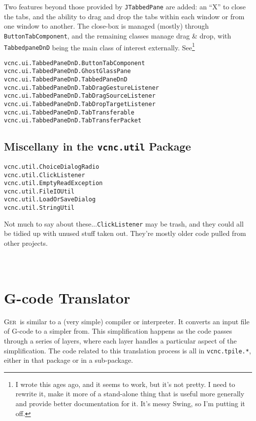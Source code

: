\documentclass[titlepage,oneside,10pt]{article}
\newcommand{\ger}{\textsc{Ger}}
\begin{document}
Two features beyond those provided by {\tt JTabbedPane}
are added: an ``X'' to close the tabs, and the ability to drag and
drop the tabs within each window or from one window to another. The
close-box is managed (mostly) through {\tt ButtonTabComponent}, and
the remaining classes manage drag \& drop, with {\tt TabbedpaneDnD}
being the main class of interest externally. See\footnote{I wrote this
ages ago, and it seems to work, but it's not pretty. I need to rewrite
it, make it more of a stand-alone thing that is useful more generally
and provide better documentation for it. It's messy Swing, so I'm
putting it off. }
\begin{verbatim}
vcnc.ui.TabbedPaneDnD.ButtonTabComponent
vcnc.ui.TabbedPaneDnD.GhostGlassPane
vcnc.ui.TabbedPaneDnD.TabbedPaneDnD
vcnc.ui.TabbedPaneDnD.TabDragGestureListener
vcnc.ui.TabbedPaneDnD.TabDragSourceListener
vcnc.ui.TabbedPaneDnD.TabDropTargetListener
vcnc.ui.TabbedPaneDnD.TabTransferable
vcnc.ui.TabbedPaneDnD.TabTransferPacket
\end{verbatim}

\subsection{Miscellany in the {\tt vcnc.util} Package}

\begin{verbatim}
vcnc.util.ChoiceDialogRadio
vcnc.util.ClickListener
vcnc.util.EmptyReadException
vcnc.util.FileIOUtil
vcnc.util.LoadOrSaveDialog
vcnc.util.StringUtil
\end{verbatim}

Not much to say about these...{\tt ClickListener} may be trash, and
they could all be tidied up with unused stuff taken out. They're
mostly older code pulled from other projects.

\begin{verbatim}
\end{verbatim}
\begin{verbatim}
\end{verbatim}
\begin{verbatim}
\end{verbatim}

\section{G-code Translator}

\ger\ is similar to a (very simple) compiler or interpreter. It
converts an input file of G-code to a simpler from. This
simplification happens as the code passes through a series of layers,
where each layer handles a particular aspect of the
simplification. The code related to this translation process is all in
{\tt vcnc.tpile.*}, either in that package or in a sub-package.
\end{document}
